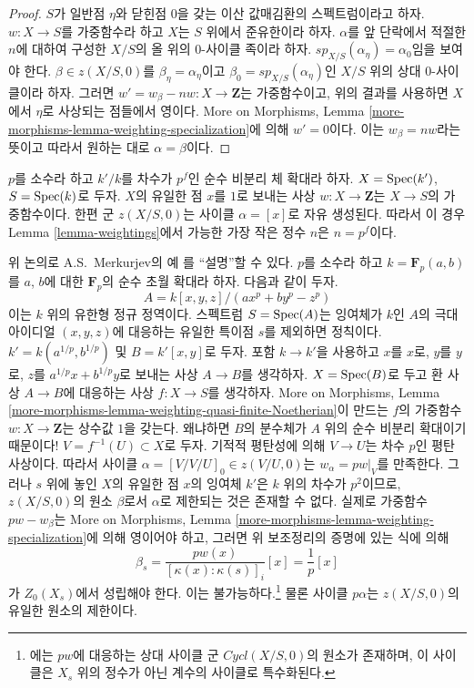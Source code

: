 \begin{proof}
\medskip\noindent
$S$가 일반점 $\eta$와 닫힌점 $0$을 갖는 이산 값매김환의
스펙트럼이라고 하자. $w : X \to S$를 가중함수라 하고 $X$는
$S$ 위에서 준유한이라 하자. $\alpha$를 앞 단락에서 적절한 $n$에
대하여 구성한 $X/S$의 올 위의 $0$-사이클 족이라 하자.
$sp_{X/S}(\alpha_\eta) = \alpha_0$임을 보여야 한다.
$\beta \in z(X/S, 0)$를 $\beta_\eta = \alpha_\eta$이고
$\beta_0 = sp_{X/S}(\alpha_\eta)$인 $X/S$ 위의 상대 $0$-사이클이라
하자. 그러면 $w' = w_\beta - nw : X \to \mathbf{Z}$는
가중함수이고, 위의 결과를 사용하면 $X$에서 $\eta$로 사상되는
점들에서 영이다. More on Morphisms, Lemma
\ref{more-morphisms-lemma-weighting-specialization}에 의해 $w' = 0$이다.
이는 $w_\beta = nw$라는 뜻이고 따라서 원하는 대로
$\alpha = \beta$이다.
\end{proof}

\begin{example}
\label{example-n-must-be-positive-sometimes}
$p$를 소수라 하고 $k'/k$를 차수가 $p^f$인 순수 비분리 체 확대라
하자. $X = \mathop{\mathrm{Spec}}(k')$, $S = \mathop{\mathrm{Spec}}(k)$로 두자. $X$의 유일한 점
$x$를 $1$로 보내는 사상 $w : X \to \mathbf{Z}$는 $X \to S$의
가중함수이다. 한편 군 $z(X/S, 0)$는 사이클 $\alpha = [x]$로
자유 생성된다. 따라서 이 경우 Lemma \ref{lemma-weightings}에서
가능한 가장 작은 정수 $n$은 $n = p^f$이다.
\end{example}

\begin{example}
\label{example-Merkurjev}
위 논의로 A.S.~Merkurjev의 예 \cite[Example 3.5.10]{SV}를 ``설명''할
수 있다. $p$를 소수라 하고 $k = \mathbf{F}_p(a, b)$를 $a$, $b$에
대한 $\mathbf{F}_p$의 순수 초월 확대라 하자. 다음과 같이 두자.
$$
A = k[x, y, z]/(a x^p + b y^p - z^p)
$$
이는 $k$ 위의 유한형 정규 정역이다. 스펙트럼 $S = \mathop{\mathrm{Spec}}(A)$는
잉여체가 $k$인 $A$의 극대 아이디얼 $(x, y, z)$에 대응하는 유일한
특이점 $s$를 제외하면 정칙이다. $k' = k(a^{1/p}, b^{1/p})$ 및
$B = k'[x, y]$로 두자. 포함 $k \to k'$을 사용하고 $x$를 $x$로,
$y$를 $y$로, $z$를 $a^{1/p}x + b^{1/p}y$로 보내는 사상
$A \to B$를 생각하자. $X = \mathop{\mathrm{Spec}}(B)$로 두고 환 사상 $A \to B$에
대응하는 사상 $f : X \to S$를 생각하자. More on Morphisms, Lemma
\ref{more-morphisms-lemma-weighting-quasi-finite-Noetherian}이 만드는
$f$의 가중함수 $w : X \to \mathbf{Z}$는 상수값 $1$을 갖는다.
왜냐하면 $B$의 분수체가 $A$ 위의 순수 비분리 확대이기 때문이다!
$V = f^{-1}(U) \subset X$로 두자. 기적적 평탄성에 의해
$V \to U$는 차수 $p$인 평탄 사상이다. 따라서 사이클
$\alpha = [V/V/U]_0 \in z(V/U, 0)$는 $w_\alpha = pw|_V$를 만족한다.
그러나 $s$ 위에 놓인 $X$의 유일한 점 $x$의 잉여체 $k'$은 $k$ 위의
차수가 $p^2$이므로, $z(X/S, 0)$의 원소 $\beta$로서
$\alpha$로 제한되는 것은 존재할 수 없다. 실제로 가중함수
$pw - w_\beta$는 More on Morphisms, Lemma
\ref{more-morphisms-lemma-weighting-specialization}에 의해 영이어야 하고,
그러면 위 보조정리의 증명에 있는 식에 의해
$$
\beta_s = \frac{pw(x)}{[\kappa(x) : \kappa(s)]_i} [x] =
\frac{1}{p}[x]
$$
가 $Z_0(X_s)$에서 성립해야 한다. 이는 불가능하다.\footnote{\cite{SV}에는
$pw$에 대응하는 상대 사이클 군 $Cycl(X/S, 0)$의 원소가 존재하며,
이 사이클은 $X_s$ 위의 정수가 아닌 계수의 사이클로 특수화된다.}
물론 사이클 $p\alpha$는 $z(X/S, 0)$의 유일한 원소의 제한이다.
\end{example}



